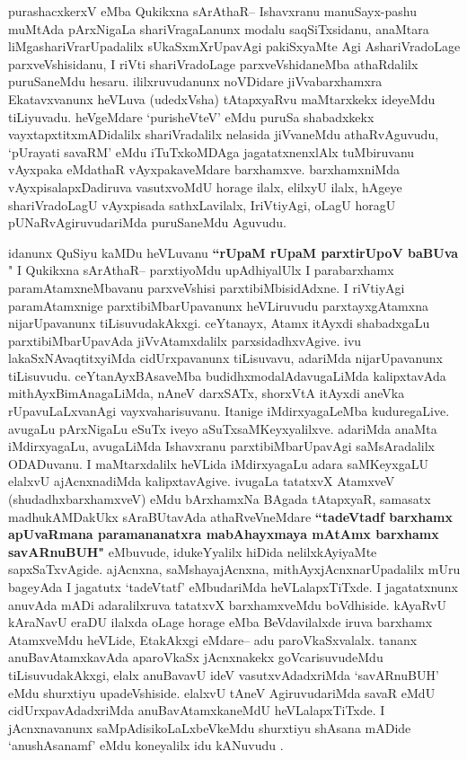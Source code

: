 \begin{artha}
purashacxkerxV eMba Qukikxna sArAthaR-- Ishavxranu manuSayx-pashu muMtAda pArxNigaLa shariVragaLanunx modalu saqSiTxsidanu, anaMtara liMgashariVrarUpadalilx sUkaSxmXrUpavAgi pakiSxyaMte Agi AshariVradoLage parxveVshisidanu, I riVti shariVradoLage parxveVshidaneMba athaRdalilx puruSaneMdu hesaru. ililxruvudanunx noVDidare jiVvabarxhamxra Ekatavxvanunx heVLuva (udedxVsha) tAtapxyaRvu maMtarxkekx ideyeMdu tiLiyuvadu. heVgeMdare `purisheVteV' eMdu puruSa shabadxkekx vayxtapxtitxmADidalilx shariVradalilx nelasida jiVvaneMdu athaRvAguvudu, `pUrayati savaRM' eMdu iTuTxkoMDAga jagatatxnenxlAlx tuMbiruvanu vAyxpaka eMdathaR vAyxpakaveMdare barxhamxve. barxhamxniMda vAyxpisalapxDadiruva vasutxvoMdU horage ilalx, elilxyU ilalx, hAgeye shariVradoLagU vAyxpisada sathxLavilalx, IriVtiyAgi, oLagU horagU pUNaRvAgiruvudariMda puruSaneMdu Aguvudu.  

idanunx QuSiyu kaMDu heVLuvanu \ndash \textbf{``rUpaM rUpaM parxtirUpoV baBUva}  \mdash  \mdash  " I Qukikxna sArAthaR-- parxtiyoMdu upAdhiyalUlx I parabarxhamx paramAtamxneMbavanu parxveVshisi parxtibiMbisidAdxne. I riVtiyAgi paramAtamxnige parxtibiMbarUpavanunx heVLiruvudu parxtayxgAtamxna nijarUpavanunx tiLisuvudakAkxgi.  ceYtanayx, Atamx itAyxdi shabadxgaLu parxtibiMbarUpavAda jiVvAtamxdalilx parxsidadhxvAgive. ivu lakaSxNAvaqtitxyiMda cidUrxpavanunx tiLisuvavu, adariMda nijarUpavanunx  tiLisuvudu. ceYtanAyxBAsaveMba budidhxmodalAdavugaLiMda kalipxtavAda mithAyxBimAnagaLiMda, nAneV darxSATx, shorxVtA itAyxdi aneVka rUpavuLaLxvanAgi vayxvaharisuvanu. Itanige iMdirxyagaLeMba kuduregaLive. avugaLu pArxNigaLu eSuTx iveyo aSuTxsaMKeyxyalilxve. adariMda anaMta iMdirxyagaLu, avugaLiMda Ishavxranu parxtibiMbarUpavAgi saMsAradalilx ODADuvanu. I maMtarxdalilx heVLida iMdirxyagaLu adara saMKeyxgaLU elalxvU ajAcnxnadiMda kalipxtavAgive. ivugaLa tatatxvX AtamxveV (shudadhxbarxhamxveV) eMdu bArxhamxNa BAgada tAtapxyaR, samasatx madhukAMDakUkx sAraBUtavAda athaRveVneMdare \textbf{``tadeVtadf barxhamx apUvaRmana paramananatxra mabAhayxmaya mAtAmx barxhamx savARnuBUH"} eMbuvude, idukeYyalilx hiDida nelilxkAyiyaMte sapxSaTxvAgide. ajAcnxna, saMshayajAcnxna, mithAyxjAcnxnarUpadalilx mUru bageyAda I jagatutx `tadeVtatf' eMbudariMda heVLalapxTiTxde. I jagatatxnunx anuvAda mADi adaralilxruva tatatxvX barxhamxveMdu boVdhiside. kAyaRvU kAraNavU eraDU ilalxda oLage horage eMba BeVdavilalxde iruva barxhamx AtamxveMdu heVLide, EtakAkxgi eMdare-- adu paroVkaSxvalalx. tananx anuBavAtamxkavAda aparoVkaSx jAcnxnakekx goVcarisuvudeMdu tiLisuvudakAkxgi, elalx anuBavavU ideV vasutxvAdadxriMda `savARnuBUH' eMdu shurxtiyu upadeVshiside. elalxvU tAneV AgiruvudariMda savaR eMdU cidUrxpavAdadxriMda anuBavAtamxkaneMdU heVLalapxTiTxde. I jAcnxnavanunx saMpAdisikoLaLxbeVkeMdu shurxtiyu shAsana mADide `anushAsanamf' eMdu koneyalilx idu kANuvudu .
\end{artha}

